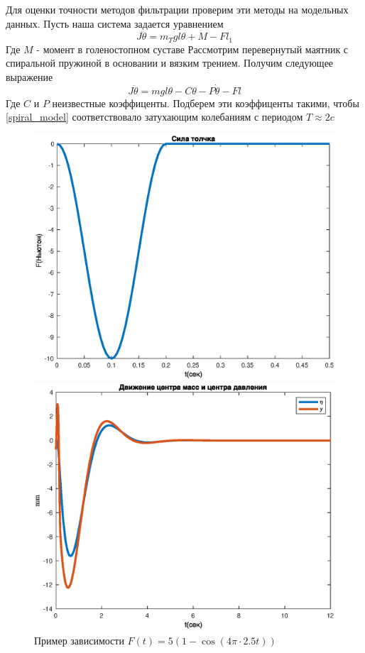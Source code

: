 \documentclass[a4paper,12pt, openany]{book}
\theoremstyle{plain} %
\theoremstyle{definition} %
\theoremstyle{remark} %
\numberwithin{equation}{chapter}
\begin{document}
{Для оценки точности методов фильтрации проверим эти методы на модельных данных.
Пусть наша система задается уравнением
\[
    J\ddot{\theta}=m_Tgl\theta+M-Fl_1
\]
Где $M$ - момент в голеностопном суставе
Рассмотрим перевернутый маятник с спиральной пружиной в основании и вязким трением.
Получим следующее выражение
\begin{equation}\label{spiral_model}
    J\ddot{\theta}=mgl\theta-C\theta-P\dot\theta-Fl
\end{equation}
Где $C$ и $P$ неизвестные коэффиценты.
Подберем эти коэффиценты такими, чтобы \eqref{spiral_model} соответствовало затухающим колебаниям
с периодом $T\approx2c$
\begin{figure}[h!]
    \begin{center}
        \begin{minipage}[h]{0.48\linewidth}
            \includegraphics[width=1\linewidth]{push_model.eps}
            \caption{Пример зависимости \break $F(t)=5(1-\cos(4\pi\cdot2.5t))$}
        \end{minipage}
        \hfill
        \begin{minipage}[h]{0.48\linewidth}
            \includegraphics[width=1\linewidth]{eta_model.eps}

\end{minipage}
\end{center}
\end{figure}}
\end{document}
